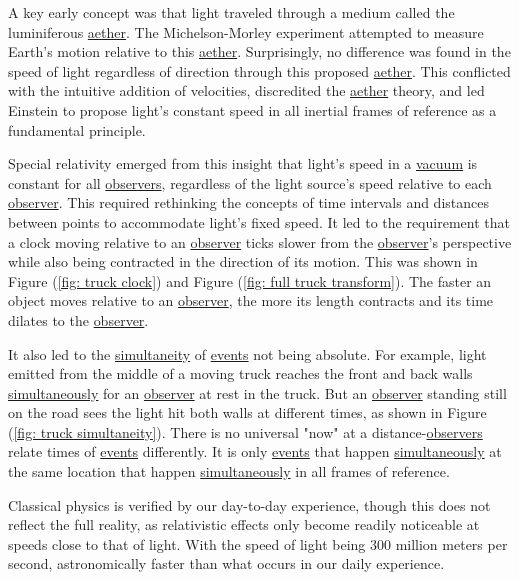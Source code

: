 A key early concept was that light traveled through a medium called the luminiferous \hyperlink{def-aether}{aether}.
The Michelson-Morley experiment attempted to measure Earth's motion relative to this \hyperlink{def-aether}{aether}.
Surprisingly, no difference was found in the speed of light regardless of direction through this proposed \hyperlink{def-aether}{aether}.
This conflicted with the intuitive addition of velocities, discredited the \hyperlink{def-aether}{aether} theory, and led Einstein to propose light's constant speed in all inertial frames of reference as a fundamental principle.

Special relativity emerged from this insight that light's speed in a \hyperlink{def-vacuum}{vacuum} is constant for all \hyperlink{def-observer}{observers}, regardless of the light source's speed relative to each \hyperlink{def-observer}{observer}.
This required rethinking the concepts of time intervals and distances between points to accommodate light's fixed speed.
It led to the requirement that a clock moving relative to an \hyperlink{def-observer}{observer} ticks slower from the \hyperlink{def-observer}{observer}'s perspective while also being contracted in the direction of its motion.
This was shown in Figure (\ref{fig: truck clock}) and Figure (\ref{fig: full truck transform}).
The faster an object moves relative to an \hyperlink{def-observer}{observer}, the more its length contracts and its time dilates to the \hyperlink{def-observer}{observer}.

It also led to the \hyperlink{def-simultaneity}{simultaneity} of \hyperlink{def-event}{events} not being absolute.
For example, light emitted from the middle of a moving truck reaches the front and back walls \hyperlink{def-simultaneity}{simultaneously} for an \hyperlink{def-observer}{observer} at rest in the truck.
But an \hyperlink{def-observer}{observer} standing still on the road sees the light hit both walls at different times, as shown in Figure (\ref{fig: truck simultaneity}).
There is no universal "now" at a distance-\hyperlink{def-observer}{observers} relate times of \hyperlink{def-event}{events} differently.
It is only \hyperlink{def-event}{events} that happen \hyperlink{def-simultaneity}{simultaneously} at the same location that happen \hyperlink{def-simultaneity}{simultaneously} in all frames of reference.

Classical physics is verified by our day-to-day experience, though this does not reflect the full reality, as relativistic effects only become readily noticeable at speeds close to that of light.
With the speed of light being 300 million meters per second, astronomically faster than what occurs in our daily experience.


